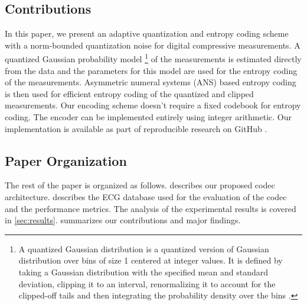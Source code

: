 \subsection{Contributions}
In this paper, we present an adaptive quantization and
entropy coding scheme with a
norm-bounded quantization noise
for digital compressive measurements.
A quantized Gaussian probability model
\footnote{A quantized Gaussian distribution is
a quantized version of Gaussian distribution over
bins of size 1 centered at integer values.
It is defined by taking a Gaussian distribution with
the specified mean and standard deviation, clipping
it to an interval, renormalizing it to account for
the clipped-off tails and then integrating the
probability density over the bins \cite{bamler2022constriction}.}
of the measurements
is estimated directly from the data
and the parameters for this model are used
for the entropy coding of the measurements.  
Asymmetric numeral systems (ANS) based
entropy coding is then used for efficient entropy coding
of the quantized and clipped measurements.
Our encoding scheme doesn't require a fixed codebook
for entropy coding.
The encoder can be implemented entirely using integer arithmetic.
Our implementation is available as part of
reproducible research on GitHub \cite{kumar2022ecgcodec}.

\subsection{Paper Organization}
The rest of the paper is organized as follows.
 describes our proposed codec architecture.
 describes the ECG database
used for the evaluation of the codec and the
performance metrics.
The analysis of the experimental results is covered in \cref{sec:results}.
 summarizes our contributions and major findings.

